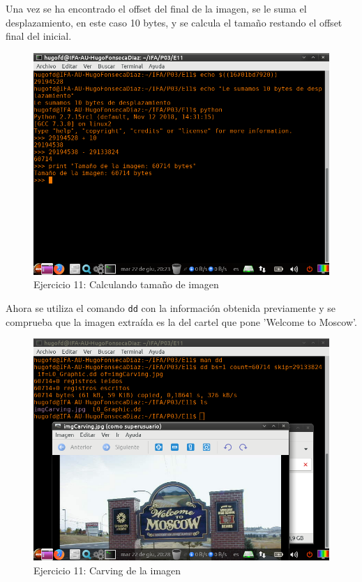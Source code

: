 \documentclass[11pt]{article}
\begin{document}
Una vez se ha encontrado el offset del final de la imagen, se le suma el desplazamiento, en este caso 10 bytes, y se calcula el tamaño restando el offset final del inicial.

\begin{figure}[H]
    \caption{Ejercicio 11: Calculando tamaño de imagen}
    \centering
    \includegraphics[scale=0.7]{e11-3.png}
\end{figure}

Ahora se utiliza el comando \verb|dd| con la información obtenida previamente y se comprueba que la imagen extraída es la del cartel que pone 'Welcome to Moscow'.

\begin{figure}[H]
    \caption{Ejercicio 11: Carving de la imagen}
    \centering
    \includegraphics[scale=0.7]{e11-4.png}
\end{figure}
\end{document}
